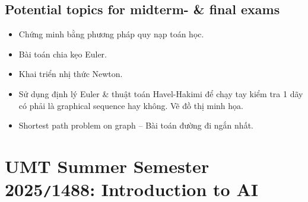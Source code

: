\documentclass{article}
\begin{document}

\subsection{Potential topics for midterm- \& final exams}

\begin{itemize}
	\item Chứng minh bằng phương pháp quy nạp toán học.
	\item Bài toán chia kẹo Euler.
	\item Khai triển nhị thức Newton.
	\item Sử dụng định lý Euler \& thuật toán Havel-Hakimi để chạy tay kiểm tra 1 dãy có phải là graphical sequence hay không. Vẽ đồ thị minh họa.
	\item Shortest path problem on graph -- Bài toán đường đi ngắn nhất.
\end{itemize}


\section{UMT Summer Semester 2025{\tt/}1488: Introduction to AI}
\end{document}
